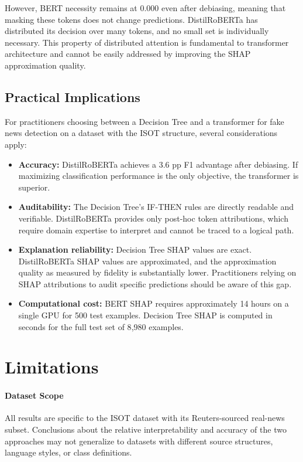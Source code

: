 \documentclass[journal,10pt,twocolumn]{IEEEtran}
\begin{document}
However, BERT necessity remains at 0.000 even after debiasing, meaning
that masking these tokens does not change predictions.  DistilRoBERTa
has distributed its decision over many tokens, and no small set is
individually necessary.  This property of distributed attention is
fundamental to transformer architecture and cannot be easily addressed
by improving the SHAP approximation quality.

\subsection{Practical Implications}

For practitioners choosing between a Decision Tree and a transformer for
fake news detection on a dataset with the ISOT structure, several
considerations apply:

\begin{itemize}
  \item \textbf{Accuracy:} DistilRoBERTa achieves a 3.6 pp F1 advantage
        after debiasing.  If maximizing classification performance is the
        only objective, the transformer is superior.
  \item \textbf{Auditability:} The Decision Tree's IF-THEN rules are
        directly readable and verifiable.  DistilRoBERTa provides only
        post-hoc token attributions, which require domain expertise to
        interpret and cannot be traced to a logical path.
  \item \textbf{Explanation reliability:} Decision Tree SHAP values are
        exact.  DistilRoBERTa SHAP values are approximated, and the
        approximation quality as measured by fidelity is substantially
        lower.  Practitioners relying on SHAP attributions to audit
        specific predictions should be aware of this gap.
  \item \textbf{Computational cost:} BERT SHAP requires approximately
        14 hours on a single GPU for 500 test examples.  Decision Tree
        SHAP is computed in seconds for the full test set of 8{,}980
        examples.
\end{itemize}

\section{Limitations}
\label{sec:limitations}

\paragraph{Dataset Scope}
All results are specific to the ISOT dataset with its Reuters-sourced
real-news subset.  Conclusions about the relative interpretability and
accuracy of the two approaches may not generalize to datasets with
different source structures, language styles, or class definitions.
\end{document}
